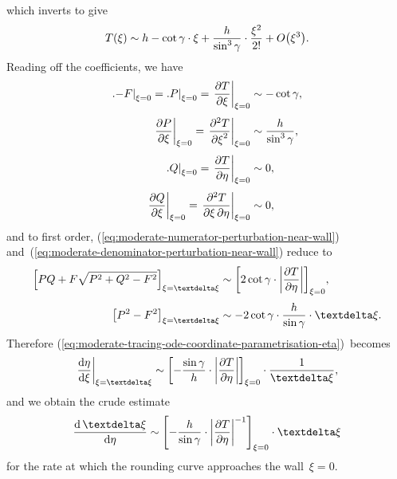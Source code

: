 which inverts to give
\begin{equation}
  T (\xi) \asy
    h - \cot\gamma \cdot \xi + \frac{h}{\sin^3\gamma} \cdot \frac{\xi^2}{2!}
    + \order \roundbr*{\xi^3}.
    \label{eq:moderate-half-plane-solution-near-wall-expansion-inverted}
\end{equation}
Reading off the coefficients, we have
\begin{align}
  \eval[\textsize]{-F}_{\xi=0}
    = \eval[\textsize]{P}_{\xi=0}
    = \eval*{\pder{T}{\xi}}_{\xi=0}
    &\asy -\cot\gamma,
      \label{eq:moderate-half-plane-solution-xi-derivative}
      \\[\tallspace]
  \eval*{\pder{P}{\xi}}_{\xi=0}
    = \eval*{\pder[2]{T}{\xi}}_{\xi=0}
    &\asy \frac{h}{\sin^3\gamma},
      \label{eq:moderate-half-plane-solution-xi-second-derivative}
      \\[\tallspace]
  \eval[\textsize]{Q}_{\xi=0}
    = \eval*{\pder{T}{\eta}}_{\xi=0}
    &\asy 0,
      \label{eq:moderate-half-plane-solution-eta-derivative}
      \\[\tallspace]
  \eval*{\pder{Q}{\xi}}_{\xi=0}
    = \eval*{\frac{\pd^2 T}{\pd\xi \pd\eta}}_{\xi=0}
    &\asy 0,
      \label{eq:moderate-half-plane-solution-mixed-derivative}
\end{align}
and to first order,
(\ref{eq:moderate-numerator-perturbation-near-wall})
and~(\ref{eq:moderate-denominator-perturbation-near-wall})
reduce to
\begin{align}
  \squarebr*{P Q + F \sqrt{P^2 + Q^2 - F^2}}_{\xi=\vd\xi} &\asy
    \squarebr*{2 \cot\gamma \cdot \abs*{\pder{T}{\eta}}}_{\xi=0},
    \label{eq:moderate-numerator-perturbation-near-wall-reduced}
    \\[\tallspace]
  \squarebr*{P^2 - F^2}_{\xi=\vd\xi} &\asy
    -2 \cot\gamma \cdot \frac{h}{\sin\gamma} \cdot \vd\xi.
    \label{eq:moderate-denominator-perturbation-near-wall-reduced}
\end{align}
Therefore
(\ref{eq:moderate-tracing-ode-coordinate-parametrisation-eta})~becomes
\begin{equation}
  \eval*{\tder{\eta}{\xi}}_{\xi=\vd\xi} \asy
    \squarebr*{
      -\frac{\sin\gamma}{h} \cdot \abs*{\pder{T}{\eta}}
    }_{\xi=0}
      \cdot
    \frac{1}{\vd\xi},
    \label{eq:moderate-fraction-perturbation-near-wall-reduced}
\end{equation}
and we obtain the crude estimate
\begin{equation}
  \tder{\vd\xi}{\eta} \asy
    \squarebr*{
      -\frac{h}{\sin\gamma} \cdot \abs*{\pder{T}{\eta}}^{-1}
    }_{\xi=0}
      \cdot \vd\xi
    \label{eq:moderate-perturbation-near-wall-approach}
\end{equation}
for the rate at which the rounding curve
approaches the wall~$\xi = 0$.


